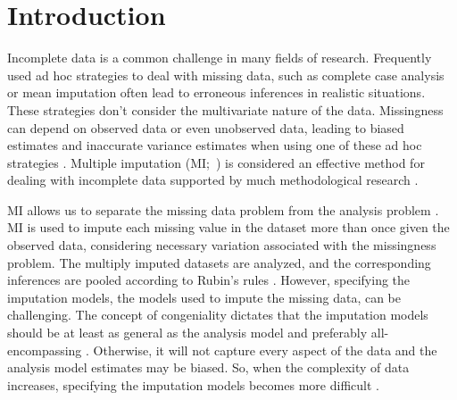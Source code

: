\documentclass[10pt, a4paper, titlepage]{article}
\begin{document}
\newpage
\tableofcontents
\newpage
\section{Introduction}
Incomplete data is a common challenge in many fields of research. Frequently used ad hoc strategies to deal with missing data, such as complete case analysis or mean imputation often lead to erroneous inferences in realistic situations. These strategies don't consider the multivariate nature of the data. Missingness can depend on observed data or even unobserved data, leading to biased estimates and inaccurate variance estimates when using one of these ad hoc strategies \citep{buurenFlexibleImputationMissing2018, kang2013, enders2017, austin2021, little2002}. Multiple imputation (MI;~\citealt{rubin1987}) is considered an effective method for dealing with incomplete data supported by much methodological research \citep{mistlerComparisonJointModel2017, buurenFlexibleImputationMissing2018, enders2017, burgette2010, austin2021, audigier2018, vanbuuren2007, grund2021, hughes2014, little2002}.

MI allows us to separate the missing data problem from the analysis problem \citep{mistlerComparisonJointModel2017, buurenFlexibleImputationMissing2018, enders2017, burgette2010, austin2021, audigier2018, vanbuuren2007, grund2021, hughes2014, little2002}. MI is used to impute each missing value in the dataset more than once given the observed data, considering necessary variation associated with the missingness problem. The multiply imputed datasets are analyzed, and the corresponding inferences are pooled according to Rubin's rules \citep{buurenFlexibleImputationMissing2018, austin2021, rubin1987, carpenter2013}. However, specifying the imputation models, the models used to impute the missing data, can be challenging. The concept of congeniality dictates that the imputation models should be at least as general as the analysis model and preferably all-encompassing \citep{grund2018, enders2018, meng1994multiple, bartlett2015, grund2016, little2002}. Otherwise, it will not capture every aspect of the data and the analysis model estimates may be biased. So, when the complexity of data increases, specifying the imputation models becomes more difficult \citep{grund2018, buurenFlexibleImputationMissing2018}.
\end{document}
